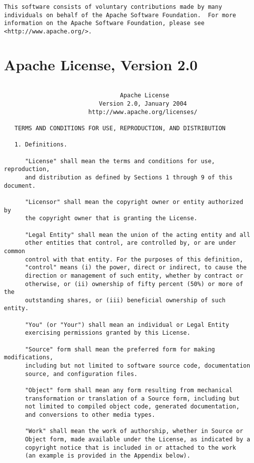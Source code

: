 \documentclass{InsightBook}
\begin{document}
\begin{verbatim}
This software consists of voluntary contributions made by many
individuals on behalf of the Apache Software Foundation.  For more
information on the Apache Software Foundation, please see
<http://www.apache.org/>.
\end{verbatim}
\section{Apache License, Version 2.0}
\begin{verbatim}

                                 Apache License
                           Version 2.0, January 2004
                        http://www.apache.org/licenses/

   TERMS AND CONDITIONS FOR USE, REPRODUCTION, AND DISTRIBUTION

   1. Definitions.

      "License" shall mean the terms and conditions for use, reproduction,
      and distribution as defined by Sections 1 through 9 of this document.

      "Licensor" shall mean the copyright owner or entity authorized by
      the copyright owner that is granting the License.

      "Legal Entity" shall mean the union of the acting entity and all
      other entities that control, are controlled by, or are under common
      control with that entity. For the purposes of this definition,
      "control" means (i) the power, direct or indirect, to cause the
      direction or management of such entity, whether by contract or
      otherwise, or (ii) ownership of fifty percent (50%) or more of the
      outstanding shares, or (iii) beneficial ownership of such entity.

      "You" (or "Your") shall mean an individual or Legal Entity
      exercising permissions granted by this License.

      "Source" form shall mean the preferred form for making modifications,
      including but not limited to software source code, documentation
      source, and configuration files.

      "Object" form shall mean any form resulting from mechanical
      transformation or translation of a Source form, including but
      not limited to compiled object code, generated documentation,
      and conversions to other media types.

      "Work" shall mean the work of authorship, whether in Source or
      Object form, made available under the License, as indicated by a
      copyright notice that is included in or attached to the work
      (an example is provided in the Appendix below).


\end{verbatim}
\end{document}

